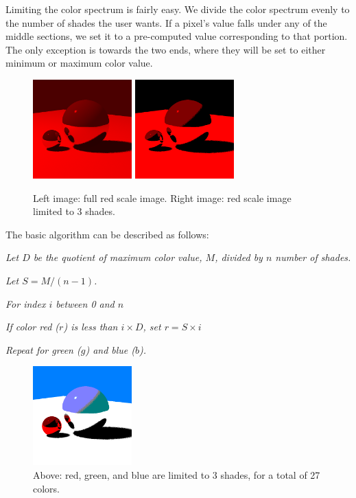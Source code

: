 \documentclass{acmsiggraph}
\begin{document}
Limiting the color spectrum is fairly easy.  We divide the color spectrum
evenly to the number of shades the user wants.  If a pixel's value falls under
any of the middle sections, we set it to a pre-computed value corresponding to
that portion.  The only exception is towards the two ends, where they will be
set to either minimum or maximum color value.
\begin{figure}[tbp]
\centering
\includegraphics[width=1.5in]{red_scale}
\includegraphics[width=1.5in]{red_shades}
\caption{Left image: full red scale image. Right image: red scale image limited to 3 shades.}
\label{red_limiting_color}
\end{figure}

The basic algorithm can be described as follows:

\textit{Let $D$ be the quotient of maximum color value, $M$, divided by $n$
number of shades.}

\textit{Let $S = M / (n - 1)$.}

\textit{For index $i$ between 0 and $n$}

\hspace{10 mm} \textit{If color red ($r$) is less than $i \times D$, set $r = S
\times i$ }

\textit{Repeat for green ($g$) and blue ($b$).}

\begin{figure}[tbp]
\centering
\includegraphics[width=1.5in]{color_shades}
\caption{Above: red, green, and blue are limited to 3 shades, for a total of 27 colors.}
\label{limiting_color}
\end{figure}
\end{document}
